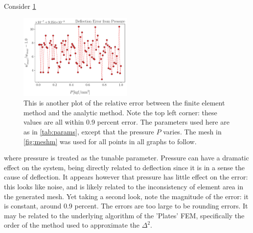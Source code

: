 \documentclass[12pt,times,twocolumn,3p]{elsarticle}
\begin{document}
Consider \cref{fig:vpe}
\begin{figure}[h]
    \centering
    \includegraphics[width=0.5\textwidth]{./yp_scaling_err.pdf}
    \caption{This is another plot of the relative error between the finite
    element method and the analytic method. Note the top left corner: these values
    are all within 0.9 percent error. The parameters used here are as in
    \cref{tab:params}, except that the pressure $P$ varies. The mesh in \cref{fig:meshm}
    was used for all points in all graphs to follow.}
    \label{fig:vpe}
\end{figure}
where pressure is treated as the tunable parameter. Pressure can have a dramatic
effect on the system, being directly related to deflection since it is in a sense
the cause of deflection. It appears however that pressure has little effect on the
error: this looks like noise, and is likely related to the inconsistency of
element area in the generated mesh. Yet taking a second look, note the magnitude
of the error: it is constant, around 0.9 percent. The errors are too large to be
rounding errors. It may be related to the underlying algorithm of the 'Plates'
FEM, specifically the order of the method used to approximate the $\Delta^2$.
\end{document}
